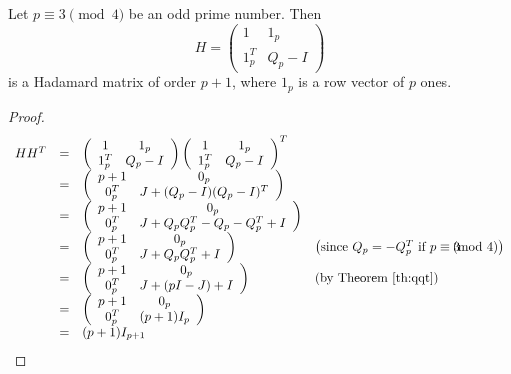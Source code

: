 \begin{theorem} \label{thm:paley-3}
 Let $p \equiv 3\pmod4$ be an odd prime number. Then
  $$H = \left(\begin{array}{cc}
     1 & 1_{p} \\
     1_{p}^T & Q_p-I
    \end{array}\right)$$
  is a Hadamard matrix of order $p+1$, where $1_p$ is a row vector of $p$ ones.

 \begin{proof}
  \equationarray
  $$\begin{array}{rcll}
     HH^T &=& \left(\begin{array}{cc}
     1 & 1_{p} \\
     1_{p}^T & Q_p-I
    \end{array}\right)
    \left(\begin{array}{cc}
     1 & 1_{p} \\
     1_{p}^T & Q_p-I
    \end{array}\right)^T \\
  & = &
    \left(\begin{array}{cc}
     p+1 & 0_p \\
     0_p^T & J + (Q_p-I)(Q_p-I)^T
     \end{array}\right)\\
  & = &
    \left(\begin{array}{cc}
     p+1 & 0_p \\
     0_p^T & J + Q_pQ_p^T-Q_p-Q_p^T+I
     \end{array}\right)\\
  & = &
    \left(\begin{array}{cc}
     p+1 & 0_p \\
     0_p^T & J + Q_pQ_p^T+I
     \end{array}\right) & \left(\text{since } Q_p = -Q_p^T \text{ if } p\equiv 3\hskip-10pt\pmod4\right)\\
  & = &
    \left(\begin{array}{cc}
     p+1 & 0_p \\
     0_p^T & J + (pI-J)+I
     \end{array}\right) & \left(\text{by Theorem~\ref{th:qqt}}\right)\\
  & = &
    \left(\begin{array}{cc}
     p+1 & 0_p \\
     0_p^T & (p+1)I_{p}
     \end{array}\right)\\
  & = & (p+1)I_{p+1}
    \end{array}$$ %
  \normalarray
 \end{proof}

\end{theorem}

